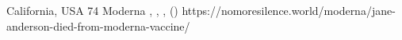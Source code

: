           {California, USA}
          {74}
          {Moderna}
          {, }
          {
            ,
            ,
             ()
          }
          {https://nomoresilence.world/moderna/jane-anderson-died-from-moderna-vaccine/}


